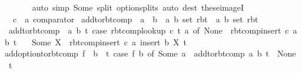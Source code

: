 \begin{isabellebody}
\ \ \ \ \ \ \isamarkupfalse%
\ {\isacharparenleft}{\kern0pt}auto\ simp{\isacharcolon}{\kern0pt}\ Some\ split{\isacharcolon}{\kern0pt}\ option{\isachardot}{\kern0pt}splits{\isacharparenright}{\kern0pt}\ {\isacharparenleft}{\kern0pt}auto\ dest{\isacharcolon}{\kern0pt}\ these{\isacharunderscore}{\kern0pt}imageI{\isacharparenright}{\kern0pt}\ \isanewline
\ \ \isamarkupfalse%
\isanewline
{}\isamarkupfalse%
%
\endisatagproof
{\isafoldproof}%
%
\isadelimproof
\isanewline
%
\endisadelimproof
\isanewline
{}\isamarkupfalse%
\isanewline
\isanewline
{}\isamarkupfalse%
\isanewline
\ \ \ c\ {\isacharcolon}{\kern0pt}{\isacharcolon}{\kern0pt}\ {\isachardoublequoteopen}{\isacharprime}{\kern0pt}a\ comparator{\isachardoublequoteclose}\isanewline
{}\isanewline
\isanewline
{}\isamarkupfalse%
\ add{\isacharunderscore}{\kern0pt}to{\isacharunderscore}{\kern0pt}rbt{\isacharunderscore}{\kern0pt}comp\ {\isacharcolon}{\kern0pt}{\isacharcolon}{\kern0pt}\ {\isachardoublequoteopen}{\isacharprime}{\kern0pt}a\ {\isasymtimes}\ {\isacharprime}{\kern0pt}b\ {\isasymRightarrow}\ {\isacharparenleft}{\kern0pt}{\isacharprime}{\kern0pt}a{\isacharcomma}{\kern0pt}\ {\isacharprime}{\kern0pt}b\ set{\isacharparenright}{\kern0pt}\ rbt\ {\isasymRightarrow}\ {\isacharparenleft}{\kern0pt}{\isacharprime}{\kern0pt}a{\isacharcomma}{\kern0pt}\ {\isacharprime}{\kern0pt}b\ set{\isacharparenright}{\kern0pt}\ rbt{\isachardoublequoteclose}\ \isanewline
\ \ {\isachardoublequoteopen}add{\isacharunderscore}{\kern0pt}to{\isacharunderscore}{\kern0pt}rbt{\isacharunderscore}{\kern0pt}comp\ {\isacharequal}{\kern0pt}\ {\isacharparenleft}{\kern0pt}{\isasymlambda}{\isacharparenleft}{\kern0pt}a{\isacharcomma}{\kern0pt}\ b{\isacharparenright}{\kern0pt}\ t{\isachardot}{\kern0pt}\ case\ rbt{\isacharunderscore}{\kern0pt}comp{\isacharunderscore}{\kern0pt}lookup\ c\ t\ a\ of\ None\ {\isasymRightarrow}\ rbt{\isacharunderscore}{\kern0pt}comp{\isacharunderscore}{\kern0pt}insert\ c\ a\ {\isacharbraceleft}{\kern0pt}b{\isacharbraceright}{\kern0pt}\ t\isanewline
\ \ {\isacharbar}{\kern0pt}\ Some\ X\ {\isasymRightarrow}\ rbt{\isacharunderscore}{\kern0pt}comp{\isacharunderscore}{\kern0pt}insert\ c\ a\ {\isacharparenleft}{\kern0pt}insert\ b\ X{\isacharparenright}{\kern0pt}\ t{\isacharparenright}{\kern0pt}{\isachardoublequoteclose}\isanewline
\isanewline
{}\isamarkupfalse%
\ {\isachardoublequoteopen}add{\isacharunderscore}{\kern0pt}option{\isacharunderscore}{\kern0pt}to{\isacharunderscore}{\kern0pt}rbt{\isacharunderscore}{\kern0pt}comp\ f\ {\isasymequiv}\ {\isacharparenleft}{\kern0pt}{\isasymlambda}b\ {\isacharunderscore}{\kern0pt}\ t{\isachardot}{\kern0pt}\ case\ f\ b\ of\ Some\ a\ {\isasymRightarrow}\ add{\isacharunderscore}{\kern0pt}to{\isacharunderscore}{\kern0pt}rbt{\isacharunderscore}{\kern0pt}comp\ {\isacharparenleft}{\kern0pt}a{\isacharcomma}{\kern0pt}\ b{\isacharparenright}{\kern0pt}\ t\ {\isacharbar}{\kern0pt}\ None\ {\isasymRightarrow}\ t{\isacharparenright}{\kern0pt}{\isachardoublequoteclose}\isanewline

\end{isabellebody}
